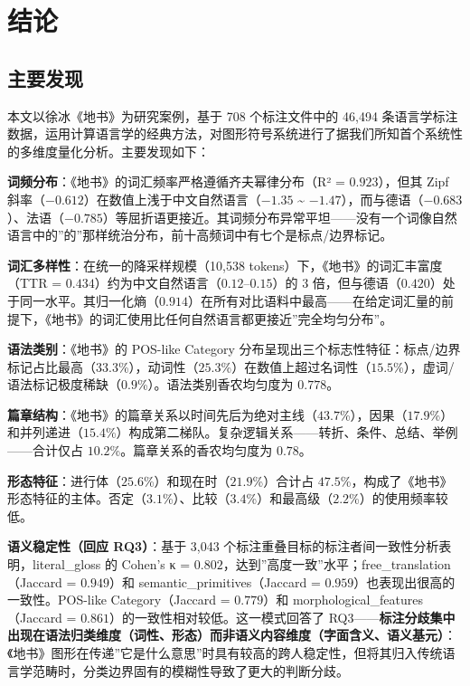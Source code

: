 \documentclass[12pt,a4paper,UTF8,fontset=founder]{ctexart}
\begin{document}
\newpage

\section{结论}\label{ux7ed3ux8bba}

\subsection{主要发现}\label{ux4e3bux8981ux53d1ux73b0}

本文以徐冰《地书》为研究案例，基于 708 个标注文件中的 46,494 条语言学标注数据，运用计算语言学的经典方法，对图形符号系统进行了据我们所知首个系统性的多维度量化分析。主要发现如下：

\textbf{词频分布}：《地书》的词汇频率严格遵循齐夫幂律分布（R² = $0.923$），但其 Zipf 斜率（$-0.612$）在数值上浅于中文自然语言（$-1.35$ \textasciitilde{} $-1.47$），而与德语（$-0.683$）、法语（$-0.785$）等屈折语更接近。其词频分布异常平坦------没有一个词像自然语言中的''的''那样统治分布，前十高频词中有七个是标点/边界标记。

\textbf{词汇多样性}：在统一的降采样规模（10,538 tokens）下，《地书》的词汇丰富度（TTR = $0.434$）约为中文自然语言（$0.12$--$0.15$）的 3 倍，但与德语（$0.420$）处于同一水平。其归一化熵（$0.914$）在所有对比语料中最高------在给定词汇量的前提下，《地书》的词汇使用比任何自然语言都更接近''完全均匀分布''。

\textbf{语法类别}：《地书》的 POS-like Category 分布呈现出三个标志性特征：标点/边界标记占比最高（$33.3$\%），动词性（$25.3$\%）在数值上超过名词性（$15.5$\%），虚词/语法标记极度稀缺（$0.9$\%）。语法类别香农均匀度为 $0.778$。

\textbf{篇章结构}：《地书》的篇章关系以时间先后为绝对主线（$43.7$\%），因果（$17.9$\%）和并列递进（$15.4$\%）构成第二梯队。复杂逻辑关系------转折、条件、总结、举例------合计仅占 $10.2$\%。篇章关系的香农均匀度为 $0.78$。

\textbf{形态特征}：进行体（$25.6$\%）和现在时（$21.9$\%）合计占 $47.5$\%，构成了《地书》形态特征的主体。否定（$3.1$\%）、比较（$3.4$\%）和最高级（$2.2$\%）的使用频率较低。

\textbf{语义稳定性（回应 RQ3）}：基于 3,043 个标注重叠目标的标注者间一致性分析表明，literal\_gloss 的 Cohen's κ = $0.802$，达到''高度一致''水平；free\_translation（Jaccard = $0.949$）和 semantic\_primitives（Jaccard = $0.959$）也表现出很高的一致性。POS-like Category（Jaccard = $0.779$）和 morphological\_features（Jaccard = $0.861$）的一致性相对较低。这一模式回答了 RQ3------\textbf{标注分歧集中出现在语法归类维度（词性、形态）而非语义内容维度（字面含义、语义基元）}：《地书》图形在传递''它是什么意思''时具有较高的跨人稳定性，但将其归入传统语言学范畴时，分类边界固有的模糊性导致了更大的判断分歧。
\end{document}
